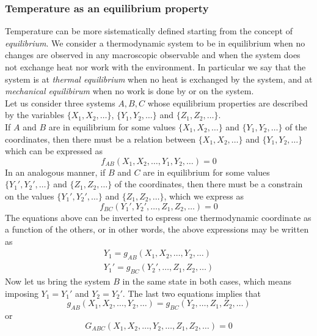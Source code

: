 \subsubsection*{Temperature as an equilibrium property}
Temperature can be more sistematically defined starting from the concept of \emph{equilibrium}. We consider a thermodynamic system to be in equilibrium when 
no changes are observed in any macroscopic observable and when the system does not exchange heat nor work with the environment. In particular we say that the system is at \emph{thermal equilibrium} when no heat is exchanged by the system, and
at \emph{mechanical equilibirum} when no work is done by or on the system. \\
Let us consider three systems $A, B, C$ whose equilibrium properties are described by the variables
$\{X_1, X_2, \dots\}$, $\{Y_1, Y_2, \dots\}$ and $\{Z_1, Z_2, \dots\}$. \\
If $A$ and $B$ are in equilibrium for some values $\{X_1, X_2, \dots\}$ and $\{Y_1, Y_2, \dots\}$ of the coordinates, then there must be a relation between $\{X_1, X_2, \dots\}$ and $\{Y_1, Y_2, \dots\}$ which can be expressed as
\begin{equation*}
    f_{AB}(X_1, X_2, \dots, Y_1, Y_2, \dots) = 0
\end{equation*}
In an analogous manner, if $B$ and $C$ are in equilibrium for some values $\{Y_1', Y_2', \dots\}$ and $\{Z_1, Z_2, \dots\}$ of the coordinates, then there must be a constrain on the values $\{Y_1', Y_2', \dots\}$ and $\{Z_1, Z_2, \dots\}$, which we express as
\begin{equation*}
    f_{BC}(Y_1', Y_2', \dots, Z_1, Z_2, \dots) = 0
\end{equation*}
The equations above can be inverted to espress one thermodynamic coordinate as a function of the others, or in other words, the above expressions may be written as
\begin{gather*}
    Y_1 = g_{AB} (X_1, X_2, \dots, Y_2, \dots) \\
    Y_1' = g_{BC} (Y_2', \dots, Z_1, Z_2, \dots)
\end{gather*}
Now let us bring the system $B$ in the same state in both cases, which means imposing $Y_1 = Y_1'$ and $Y_2 = Y_2'$. The last two equations implies that 
\begin{equation}
    g_{AB} (X_1, X_2, \dots, Y_2, \dots) = g_{BC} (Y_2, \dots, Z_1, Z_2, \dots)
    \label{eq:equality_of_g}
\end{equation}
or
\begin{equation*}
    G_{ABC} (X_1, X_2, \dots, Y_2, \dots, Z_1, Z_2, \dots) = 0
\end{equation*}
